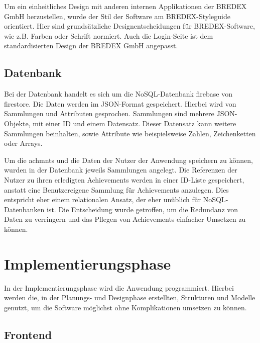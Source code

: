 \documentclass[11pt]{article}
\begin{document}
Um ein einheitliches Design mit anderen internen Applikationen der BREDEX GmbH herzustellen, wurde der Stil der Software
am BREDEX-Styleguide orientiert. Hier sind grundsätzliche Designentscheidungen für BREDEX-Software, wie z.B. Farben oder Schrift normiert.
Auch die Login-Seite ist dem standardisierten Design der BREDEX GmbH angepasst.

\subsection{Datenbank}

Bei der Datenbank handelt es sich um die \gls{NoSQL}-Datenbank \gls{firebase}
von \gls{firestore}. Die Daten werden im JSON-Format gespeichert. Hierbei wird
von Sammlungen und Attributen gesprochen. Sammlungen sind mehrere JSON-Objekte, mit einer
ID und einem Datensatz. Dieser Datensatz kann weitere Sammlungen beinhalten,
sowie Attribute wie beispielsweise Zahlen, Zeichenketten oder Arrays.

Um die \glspl{achmnt} und die Daten der Nutzer der Anwendung speichern zu können,
wurden in der Datenbank jeweils Sammlungen angelegt. Die Referenzen der Nutzer zu ihren
erledigten Achievements werden in einer ID-Liste gespeichert, anstatt eine Benutzereigene Sammlung für Achievements
anzulegen. Dies entspricht eher einem relationalen Ansatz, der eher unüblich für \Gls{NoSQL}-Datenbanken ist.
Die Entscheidung wurde getroffen, um die Redundanz von Daten zu verringern und das Pflegen von Achievements
einfacher Umsetzen zu können. 


%
%

\section{Implementierungsphase}
In der Implementierungsphase wird die Anwendung programmiert. Hierbei werden die,
in der Planungs- und Designphase erstellten, Strukturen und Modelle genutzt, um die Software möglichst ohne
Komplikationen umsetzen zu können.

\subsection{Frontend}
\end{document}

